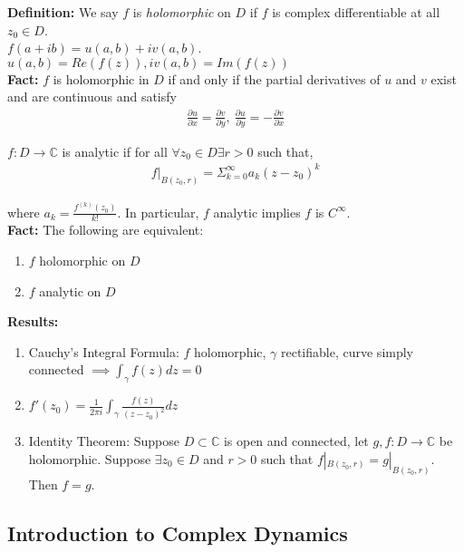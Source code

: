 \documentclass[12pt]{article}
\begin{document}
\textbf{Definition:} We say $f$ is \textit{holomorphic} on $D$ if $f$ is complex differentiable at all $z_0 \in D$.\\

$f(a+ ib) = u(a, b) + iv(a, b)$. $u(a, b) = Re(f(z)), iv(a,b) = Im(f(z))$\\

\textbf{Fact:} $f$ is holomorphic in $D$ if and only if the partial derivatives of $u$ and $v$ exist and are continuous and satisfy
\begin{align}
\frac{\partial u}{\partial x} = \frac{\partial v}{\partial y}, \ \frac{\partial u}{\partial y} = - \frac{\partial v}{\partial x}
\end{align}

$f: D \to \mathbb{C}$ is analytic if for all $\forall z_0 \in D \exists r > 0$ such that,
\begin{align*}
f|_{B(z_0, r)} = \Sigma_{k=0}^{\infty} a_k (z - z_0)^k
\end{align*}

where $a_k = \frac{f^{(k)}(z_0)}{k!}$. In particular, $f$ analytic implies $f$ is $C^{\infty}$.\\

\textbf{Fact:} The following are equivalent:
\begin{enumerate}[label=(\alph*)]

\item $f$ holomorphic on $D$
\item $f$ analytic on $D$
\end{enumerate}

\textbf{Results:}
\begin{enumerate}[label=(\alph*)]

\item Cauchy's Integral Formula: $f$ holomorphic, $\gamma$ rectifiable, curve simply connected $\implies \int_{\gamma} f(z) dz = 0$

\item $f'(z_0) = \frac{1}{2\pi i} \int_{\gamma}\frac{f(z)}{(z-z_0)^2}dz$

\item Identity Theorem: Suppose $D \subset \mathbb{C}$ is open and connected, let $g, f: D \to \mathbb{C}$ be holomorphic. Suppose $\exists z_0 \in D$ and $r > 0$ such that $f|_{B(z_0, r)} = g|_{B(z_0, r)}$. Then $f = g$.
\end{enumerate}

\subsection{Introduction to Complex Dynamics}
\end{document}
